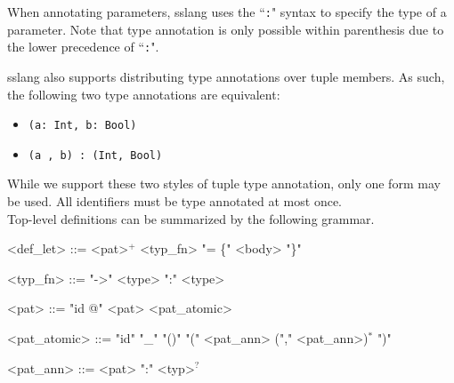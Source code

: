 \documentclass{article}
\begin{document}
When annotating parameters, sslang uses the ``\texttt{:}" syntax to specify the type of a parameter. Note that type annotation is only possible within parenthesis due to the lower precedence of ``\texttt{:}".

sslang also supports distributing type annotations over tuple members. As such, the following two type annotations are equivalent:
\begin{itemize}
    \item \texttt{(a: Int, b: Bool)}
    \item \texttt{(a , b) : (Int, Bool)}
\end{itemize}

While we support these two styles of tuple type annotation, only one form may be used. All identifiers must be type annotated at most once. \\

Top-level definitions can be summarized by the following grammar.
\setlength{\grammarindent}{9em}
\begin{grammar}
<def_let> ::= <pat>$^{+}$ <typ_fn> "= \{" <body> "\}"

<typ_fn> ::= "->" <type>
\alt ":" <type>

<pat> ::= "id @" <pat>
\alt <pat_atomic>

<pat_atomic> ::= "id"
\alt "_"
\alt "()"
\alt "(" <pat_ann> ("," <pat_ann>)$^{*}$ ")"

<pat_ann> ::= <pat> ":" <typ>$^{?}$
\end{grammar}
\end{document}
